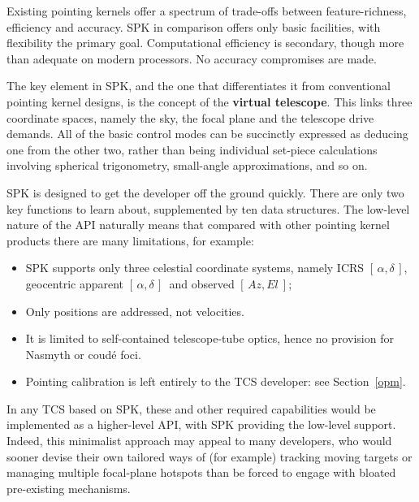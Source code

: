 \documentclass[11pt,fleqn,twoside,\paper]{article}
\renewcommand{\_}{{\tt\char'137}}     %
\newcommand{\radec}     {$[\,\alpha,\delta\,]$}
\newcommand{\azel}      {$[\,Az,El~]$}
\begin{document}
Existing pointing kernels offer a spectrum of trade-offs
between feature-richness, efficiency and accuracy.  SPK in
comparison offers only basic facilities, with flexibility
the primary goal.  Computational efficiency is secondary, though
more than adequate on modern processors.  No accuracy compromises
are made.

The key element in SPK, and the one that differentiates it from
conventional pointing kernel designs, is the concept of the
{\bf virtual telescope}.  This links three coordinate spaces,
namely the sky, the focal plane and the telescope drive demands.
All of the basic control modes can be succinctly expressed
as deducing one from the other two, rather than being
individual set-piece calculations involving spherical
trigonometry, small-angle approximations, and so on.

SPK is designed to get the developer off the ground quickly.  There
are only two key functions to learn about, supplemented by
ten data structures.  The low-level
nature of the API naturally means that compared with other pointing
kernel products there are many limitations, for example:
\begin{itemize}
\item SPK supports only three celestial coordinate systems, namely
      ICRS \radec, geocentric apparent \radec\ and observed \azel;
\item Only positions are addressed, not velocities.
\item It is limited to self-contained telescope-tube optics, hence no
      provision for Nasmyth or coud\'{e} foci.
\item Pointing calibration is left entirely to
      the TCS developer:  see Section~\ref{opm}.
\end{itemize}
In any TCS based on SPK, these and other required capabilities would
be implemented as a higher-level API, with SPK providing the low-level
support.  Indeed, this minimalist
approach may appeal to many developers, who would
sooner devise their own tailored ways of (for example) tracking moving
targets or managing multiple focal-plane hotspots than be
forced to engage with bloated pre-existing mechanisms.
\end{document}
